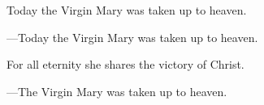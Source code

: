 \responsory

\begin{hangpar}


\medskip Today the Virgin Mary was taken up to heaven.

{\color{red}---\thinspace }Today the Virgin Mary was taken up to heaven.

\medskip For all eternity she shares the victory of Christ.

{\color{red}---\thinspace }The Virgin Mary was taken up to heaven.
\end{hangpar}